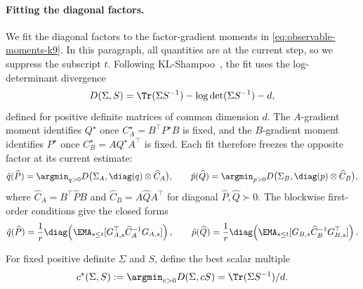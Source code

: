 \paragraph{Fitting the diagonal factors.}
We fit the diagonal factors to the factor-gradient moments in
\eqref{eq:observable-moments-k9}. In this paragraph, all quantities are
at the current step, so we suppress the subscript $t$. Following
KL-Shampoo~\cite{klshampoo}, the fit uses the log-determinant
divergence~\cite{logdetdiv}
\[
  D(\Sigma,S)=\Tr(\Sigma S^{-1})-\log\det(\Sigma S^{-1})-d,
\]
defined for positive definite matrices of common dimension $d$.
The $A$-gradient moment identifies $Q^\star$ once
$C^\star_A=B^\top P^\star B$ is fixed, and the $B$-gradient moment
identifies $P^\star$ once $C^\star_B=AQ^\star A^\top$ is fixed. Each fit
therefore freezes the opposite factor at its current estimate:
\begin{equation}\label{eq:factor-fit-k9}
  \hat{q}(\widehat P)
  =
  \argmin_{q>0}
  D\bigl(\Sigma_A,\diag(q)\otimes\widehat C_A\bigr),
  \qquad
  \hat{p}(\widehat Q)
  =
  \argmin_{p>0}
  D\bigl(\Sigma_B,\diag(p)\otimes\widehat C_B\bigr),
\end{equation}
where
$\widehat C_A=B^\top\widehat P B$ and
$\widehat C_B=A\widehat Q A^\top$ for diagonal
$\widehat P,\widehat Q\succ0$. The blockwise first-order conditions give
the closed forms
\[
  \hat{q}(\widehat P)
  =
  \frac1r\diag\!\left(
    \EMA_{s\le t}[G_{A,s}^\top\widehat C_A^{-1}G_{A,s}]
  \right),
  \qquad
  \hat{p}(\widehat Q)
  =
  \frac1r\diag\!\left(
    \EMA_{s\le t}[G_{B,s}\widehat C_B^{-1}G_{B,s}^\top]
  \right).
\]

For fixed positive definite $\Sigma$ and $S$, define the best scalar
multiple
\[
  c^\star(\Sigma,S)
  :=
  \argmin_{c>0}D(\Sigma,cS)
  =
  \Tr(\Sigma S^{-1})/d .
\]

